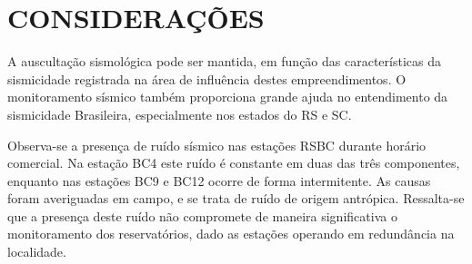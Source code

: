 \section{CONSIDERAÇÕES}
\par{A auscultação sismológica pode ser mantida, em função das características da sismicidade registrada na área de influência destes empreendimentos. O monitoramento sísmico também proporciona grande ajuda no entendimento da sismicidade Brasileira, especialmente nos estados do RS e SC.}
\par{Observa-se a presença de ruído sísmico nas estações RSBC durante horário comercial.  Na estação BC4 este ruído é constante em duas das três componentes, enquanto nas estações BC9 e BC12 ocorre de forma intermitente. As causas foram averiguadas em campo, e se trata de ruído de origem antrópica. Ressalta-se que a presença deste ruído não compromete de maneira significativa o monitoramento dos reservatórios, dado as estações operando em redundância na localidade.}

\assinaturaLucas
